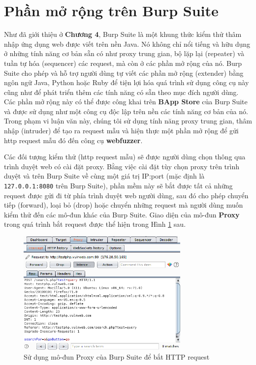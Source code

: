 \section{Phần mở rộng trên Burp Suite}
Như đã giới thiệu ở \textbf{Chương 4}, Burp Suite là một khung thức kiểm thử thâm nhập ứng dụng web được viết trên nền Java. Nó không chỉ nổi tiếng và hữu dụng ở những tính năng cơ bản sẵn có như proxy trung gian, bộ lặp lại (repeater) và tuần tự hóa (sequencer) các request, mà còn ở các phần mở rộng của nó. Burp Suite cho phép và hỗ trợ người dùng tự viết các phần mở rộng (extender) bằng ngôn ngữ Java, Python hoặc Ruby để tiện lợi hóa quá trình sử dụng công cụ này cũng như để phát triển thêm các tính năng có sẵn theo mục đích người dùng. Các phần mở rộng này có thể được công khai trên \textbf{BApp Store} của Burp Suite và được sử dụng như một công cụ độc lập trên nền các tính năng cơ bản của nó. Trong phạm vi luận văn này, chúng tôi sử dụng tính năng proxy trung gian, thâm nhập (intruder) để tạo ra request mẫu và hiện thực một phần mở rộng để gửi \acrshort{http} request mẫu đó đến công cụ \textbf{webfuzzer}.\par
Các đối tượng kiểm thử (\acrshort{http} request mẫu) sẽ được người dùng chọn thông qua trình duyệt web có cài đặt proxy. Bằng việc cài đặt tùy chọn proxy trên trình duyệt và trên Burp Suite về cùng một giá trị IP:port (mặc định là \texttt{127.0.0.1:8080} trên Burp Suite), phần mềm này sẽ bắt được tất cả những request được gửi đi từ phía trình duyệt web người dùng, sau đó cho phép chuyển tiếp (forward), loại bỏ (drop) hoặc chuyển những request mà người dùng muốn kiểm thử đến các mô-đun khác của Burp Suite. Giao diện của mô-đun \textbf{Proxy} trong quá trình bắt request được thể hiện trong Hình \ref{fig:burp-proxy} sau.
\begin{figure}[H]
  \centering
    \includegraphics[width=0.75\textwidth,keepaspectratio=true]{images/burp-proxy.png}
  \caption{Sử dụng mô-đun Proxy của Burp Suite để bắt HTTP request}
  \label{fig:burp-proxy}
\end{figure}
